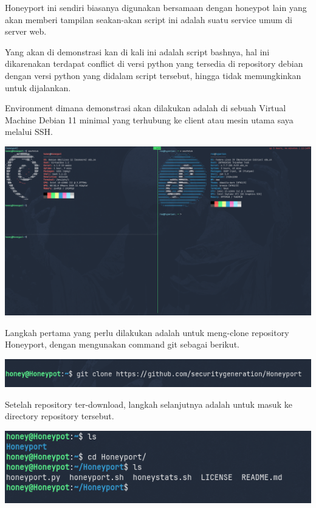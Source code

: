 \documentclass[12pt, a4paper]{article}
\begin{document}
  Honeyport ini sendiri biasanya digunakan bersamaan dengan honeypot lain yang
  akan memberi tampilan seakan-akan script ini adalah suatu service umum di
  server web.

  Yang akan di demonstrasi kan di kali ini adalah script bashnya, hal ini dikarenakan
  terdapat conflict di versi python yang tersedia di repository debian dengan
  versi python yang didalam script tersebut, hingga tidak memungkinkan untuk dijalankan.

  Environment dimana demonstrasi akan dilakukan adalah di sebuah Virtual Machine
  Debian 11 minimal yang terhubung ke client atau mesin utama saya melalui SSH.

  \begin{center}
    \includegraphics[scale=0.2]{SSHIMG}
  \end{center}

  Langkah pertama yang perlu dilakukan adalah untuk meng-clone repository
  Honeyport, dengan mengunakan command git sebagai berikut.

  \begin{center}
    \includegraphics[scale=0.5]{GITCLONE}
  \end{center}

  Setelah repository ter-download, langkah selanjutnya adalah untuk masuk
  ke directory repository tersebut.

  \begin{center}
    \includegraphics[scale=0.5]{HONEYPORTDIR}
  \end{center}
\end{document}
